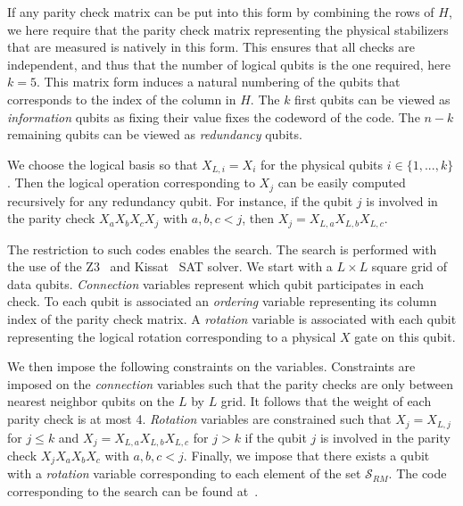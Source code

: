 \documentclass[%
 reprint,
superscriptaddress,
 amsmath,amssymb,
 aps,
]{revtex4-2}
\begin{document}
If any parity check matrix can be put into this form by combining the rows of $H$, we here require that the parity check matrix representing the physical stabilizers that are measured is natively in this form. This ensures that all checks are independent, and thus that the number of logical qubits is the one required, here $k = 5$. This matrix form induces a natural numbering of the qubits that corresponds to the index of the column in $H$. The $k$ first qubits can be viewed as \textit{information} qubits as fixing their value fixes the codeword of the code. The $n-k$ remaining qubits can be viewed as \textit{redundancy} qubits. 

We choose the logical basis so that $X_{L,i} = X_i$ for the physical qubits $i \in \{1,...,k\}$. Then the logical operation corresponding to $X_j$ can be easily computed recursively for any redundancy qubit. For instance, if the qubit $j$ is involved in the parity check $X_a X_b X_c X_j$ with $a,b,c<j$, then $X_{j} = X_{L,a} X_{L,b} X_{L,c}$.

The restriction to such codes enables the search. The search is performed with the use of the Z3~\cite{z3} and Kissat~\cite{kissat,kissat-github} SAT solver. We start with a $L \times L$ square grid of data qubits. \textit{Connection} variables represent which qubit participates in each check. To each qubit is associated an \textit{ordering} variable representing its column index of the parity check matrix. A \textit{rotation} variable is associated with each qubit representing the logical rotation corresponding to a physical $X$ gate on this qubit.

We then impose the following constraints on the variables. Constraints are imposed on the \textit{connection} variables such that the parity checks are only between nearest neighbor qubits on the $L$ by $L$ grid. It follows that the weight of each parity check is at most 4. \textit{Rotation} variables are constrained such that $X_j = X_{L,j}$ for $j \le k$ and $X_j = X_{L,a} X_{L,b} X_{L,c}$ for $j > k$ if the qubit $j$ is involved in the parity check $X_j X_{a} X_{b} X_{c}$ with $a,b,c < j$. Finally, we impose that there exists a qubit with a \textit{rotation} variable corresponding to each element of the set $\mathcal S _{RM}$. The code corresponding to the search can be found at~\cite{CodeGithub}.


\end{document}
